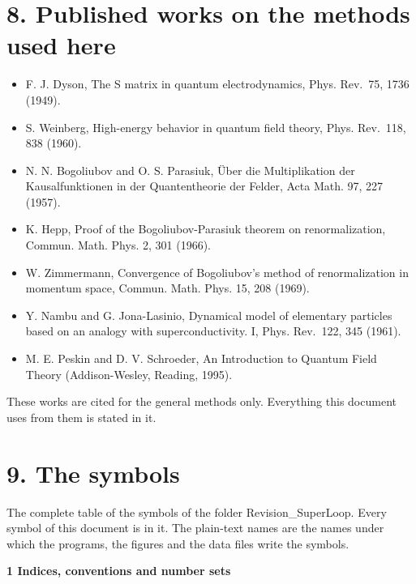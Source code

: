 \documentclass[
  10pt,
]{article}
\providecommand{\tightlist}{%
  \setlength{\itemsep}{0pt}\setlength{\parskip}{0pt}}
\begin{document}
\hypertarget{published-works-on-the-methods-used-here}{%
\section{8. Published works on the methods used
here}\label{published-works-on-the-methods-used-here}}

\begin{itemize}
\tightlist
\item
  F. J. Dyson, The S matrix in quantum electrodynamics, Phys. Rev.~75,
  1736 (1949).
\item
  S. Weinberg, High-energy behavior in quantum field theory, Phys.
  Rev.~118, 838 (1960).
\item
  N. N. Bogoliubov and O. S. Parasiuk, Über die Multiplikation der
  Kausalfunktionen in der Quantentheorie der Felder, Acta Math. 97, 227
  (1957).
\item
  K. Hepp, Proof of the Bogoliubov-Parasiuk theorem on renormalization,
  Commun. Math. Phys. 2, 301 (1966).
\item
  W. Zimmermann, Convergence of Bogoliubov's method of renormalization
  in momentum space, Commun. Math. Phys. 15, 208 (1969).
\item
  Y. Nambu and G. Jona-Lasinio, Dynamical model of elementary particles
  based on an analogy with superconductivity. I, Phys. Rev.~122, 345
  (1961).
\item
  M. E. Peskin and D. V. Schroeder, An Introduction to Quantum Field
  Theory (Addison-Wesley, Reading, 1995).
\end{itemize}

These works are cited for the general methods only. Everything this
document uses from them is stated in it.

\hypertarget{the-symbols}{%
\section{9. The symbols}\label{the-symbols}}

The complete table of the symbols of the folder Revision\_SuperLoop.
Every symbol of this document is in it. The plain-text names are the
names under which the programs, the figures and the data files write the
symbols.

\textbf{1 Indices, conventions and number sets}
\end{document}
